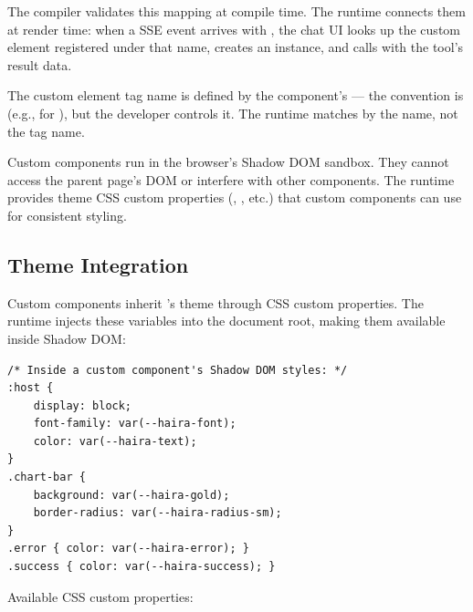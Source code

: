 The compiler validates this mapping at compile time. The runtime connects them at render time: when a  SSE event arrives with , the chat UI looks up the custom element registered under that name, creates an instance, and calls  with the tool's result data.

The custom element tag name is defined by the component's  --- the convention is  (e.g.,  for ), but the developer controls it. The runtime matches by the  name, not the tag name.

\begin{note}
Custom components run in the browser's Shadow DOM sandbox. They cannot access the parent page's DOM or interfere with other components. The \haira{} runtime provides theme CSS custom properties (, , etc.) that custom components can use for consistent styling.
\end{note}

\subsection{Theme Integration}

Custom components inherit \haira{}'s theme through CSS custom properties. The runtime injects these variables into the document root, making them available inside Shadow DOM:

\begin{lstlisting}[language={}]
/* Inside a custom component's Shadow DOM styles: */
:host {
    display: block;
    font-family: var(--haira-font);
    color: var(--haira-text);
}
.chart-bar {
    background: var(--haira-gold);
    border-radius: var(--haira-radius-sm);
}
.error { color: var(--haira-error); }
.success { color: var(--haira-success); }
\end{lstlisting}

Available CSS custom properties:

